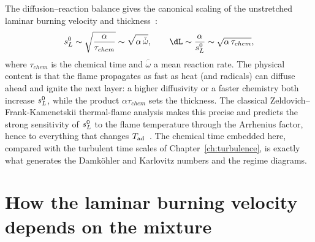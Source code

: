 The diffusion--reaction balance gives the canonical scaling of the unstretched laminar burning velocity and thickness~\cite{lecture9,glassman2014combustion}:
\begin{equation}
\sLz\sim\sqrt{\frac{\alpha}{\tau_{chem}}}\sim\sqrt{\alpha\,\bar{\dot\omega}},\qquad
\dL\sim\frac{\alpha}{\sLz}\sim\sqrt{\alpha\,\tau_{chem}} ,
\label{eq:sL-scaling}
\end{equation}
where $\tau_{chem}$ is the chemical time and $\bar{\dot\omega}$ a mean reaction rate. The physical content is that the flame propagates as fast as heat (and radicals) can diffuse ahead and ignite the next layer: a higher diffusivity or a faster chemistry both increase $s_L^{0}$, while the product $\alpha\tau_{chem}$ sets the thickness. The classical Zeldovich--Frank-Kamenetskii thermal-flame analysis makes this precise and predicts the strong sensitivity of $s_L^{0}$ to the flame temperature through the Arrhenius factor, hence to everything that changes $T_{\mathrm{ad}}$~\cite{glassman2014combustion,warnatz2006combustion}. The chemical time embedded here, compared with the turbulent time scales of Chapter~\ref{ch:turbulence}, is exactly what generates the Damk\"ohler and Karlovitz numbers and the regime diagrams.

\section{How the laminar burning velocity depends on the mixture}

